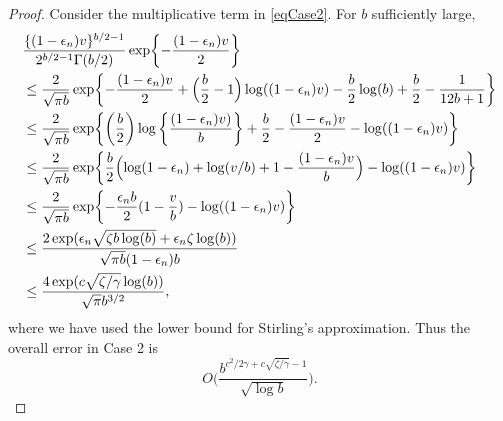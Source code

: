 \documentclass[10pt, reqno]{amsart}
\numberwithin{equation}{section}
\begin{document}
\begin{appendix}
\begin{proof}
	Consider the multiplicative term in \eqref{eqCase2}. For $b$ sufficiently large,
	\begin{align*}
		&\frac{\{(1 -\epsilon_n)v\}^{b/2-1}}{2^{b/2 -1}\Gamma(b/2)} \exp\biggl\{ -\frac{ (1 -\epsilon_n)v }{2} \biggr\} \\
		&\leq  \frac{2}{\sqrt{\pi b}} \exp\biggl\{-\frac{(1 - \epsilon_n)v}{2} + \Bigl(\frac{b}{2} - 1\Bigr) \log( (1- \epsilon_n)v ) - \frac{b}{2}\log(b) + \frac{b}{2} - \frac{1}{12b + 1}  \biggr\}\\
		&\leq \frac{2}{\sqrt{\pi b}} \exp\biggl\{\left(\frac{b}{2}\right) \log\left\{ \frac{(1- \epsilon_n)v )}{b} \right\} +  \frac{b}{2} -\frac{(1 - \epsilon_n)v}{2} - \log((1-\epsilon_n)v) \biggr\}\\
		&\leq \frac{2}{\sqrt{\pi b}} \exp\biggl\{ \frac{b}{2}\Bigl( \log(1 - \epsilon_n) + \log(v/b) + 1 - \frac{(1-\epsilon_n)v}{b}\Bigr) - \log( (1- \epsilon_n)v )   \biggr\}\\
		&\leq\frac{2}{\sqrt{\pi b}} \exp\biggl\{ -\frac{\epsilon_n b}{2} (1 - \frac{v}{b}) - \log( (1- \epsilon_n)v )  \biggr\}\\
		&\leq \frac{2\exp(\epsilon_n\sqrt{\zeta b\log(b)} + \epsilon_n\zeta\log(b) )}{\sqrt{\pi b}(1-\epsilon_n)b } \\
		&\leq \frac{4\exp(c\sqrt{\zeta/\gamma}\log(b))}{\sqrt{\pi}b^{3/2}  },
	\end{align*}
	where we have used the lower bound for Stirling's approximation.
	Thus the overall error in Case 2 is
	\[
	O\biggl( \frac{b^{c^2/2\gamma + c\sqrt{\zeta/\gamma} - 1}}{\sqrt{\log b}} \biggr).
	\]
	

\end{proof}
\end{appendix}
\end{document}
